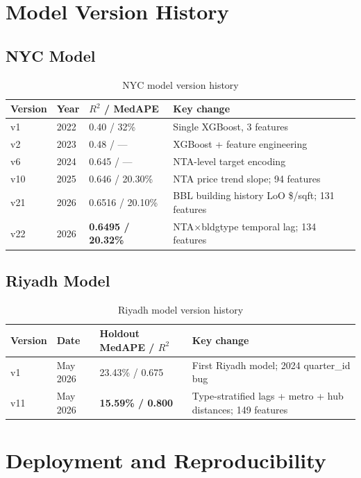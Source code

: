\documentclass[11pt, a4paper, twoside]{report}
\begin{document}
\chapter{Model Version History}
\label{ch:versions}

\section{NYC Model}
\begin{table}[H]
  \centering
  \caption{NYC model version history}
  \begin{tabular}{llll}
    \toprule
    Version & Year & $R^2$ / MedAPE & Key change \\
    \midrule
    v1  & 2022 & 0.40 / 32\%  & Single XGBoost, 3 features \\
    v2  & 2023 & 0.48 / ---   & XGBoost + feature engineering \\
    v6  & 2024 & 0.645 / ---  & NTA-level target encoding \\
    v10 & 2025 & 0.646 / 20.30\% & NTA price trend slope; 94 features \\
    v21 & 2026 & 0.6516 / 20.10\% & BBL building history LoO \$/sqft; 131 features \\
    v22 & 2026 & \textbf{0.6495 / 20.32\%} & NTA$\times$bldgtype temporal lag; 134 features \\
    \bottomrule
  \end{tabular}
\end{table}

\section{Riyadh Model}
\begin{table}[H]
  \centering
  \caption{Riyadh model version history}
  \begin{tabular}{llll}
    \toprule
    Version & Date & Holdout MedAPE / $R^2$ & Key change \\
    \midrule
    v1 & May 2026 & 23.43\% / 0.675 & First Riyadh model; 2024 quarter\_id bug \\
    v11 & May 2026 & \textbf{15.59\% / 0.800} & Type-stratified lags + metro + hub distances; 149 features \\
    \bottomrule
  \end{tabular}
\end{table}

\chapter{Deployment and Reproducibility}
\label{ch:deployment}
\end{document}
